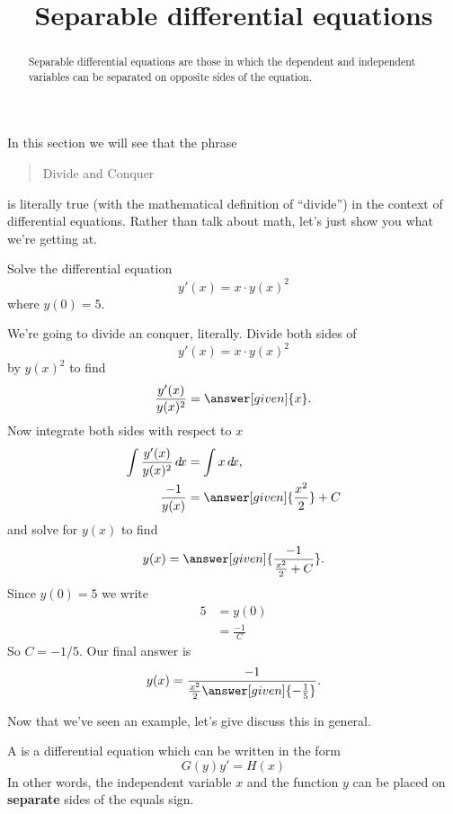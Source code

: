 \documentclass{ximera}
\title[Dig-In:]{Separable differential equations}
\begin{document}
\begin{abstract}
  Separable differential equations are those in which the dependent and independent variables can be separated on opposite sides of the equation.
\end{abstract}
\maketitle

In this section we will see that the phrase
\begin{quote}
  Divide and Conquer
\end{quote}
is literally true (with the mathematical definition of ``divide'') in
the context of differential equations. Rather than talk about math,
let's just show you what we're getting at.

\begin{example}
  Solve the differential equation
  \[
  y'(x) = x\cdot y(x)^2
  \]
  where $y(0)= 5$.
  \begin{explanation}
    We're going to divide an conquer, literally. Divide both sides of
    \[
    y'(x) = x\cdot y(x)^2
    \]
    by $y(x)^2$ to find
    \[
    \frac{y'(x)}{y(x)^2} = \answer[given]{x}.
    \]
    Now integrate both sides with respect to $x$
    \begin{align*}
      \int \frac{y'(x)}{y(x)^2} \d x &= \int x \d x,\\
      \frac{-1}{y(x)} &= \answer[given]{\frac{x^2}{2}}+C
    \end{align*}
    and solve for $y(x)$ to find
    \[
    y(x) = \answer[given]{\frac{-1}{\frac{x^2}{2}+C}}.
    \]
    Since $y(0) =5$ we write
    \begin{align*}
    5&= y(0)\\
    &=\frac{-1}{C}
    \end{align*}
    So $C= -1/5$. Our final answer is
    \[
    y(x) = \frac{-1}{\frac{x^2}{2} \answer[given]{-\frac{1}{5}}}.
    \]
  \end{explanation}
\end{example}

Now that we've seen an example, let's give discuss this in general.

\begin{definition}
  A  is a differential equation
  which can be written in the form
  \[
  G(y) y' = H(x)
  \]
  In other words, the independent variable $x$ and the function $y$
  can be placed on \textbf{separate} sides of the equals sign.
\end{definition}
\end{document}
